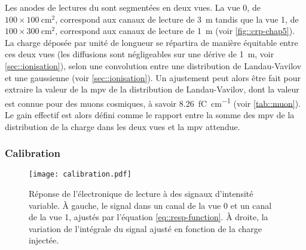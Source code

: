       Les anodes de lectures du \TOO sont segmentées en deux vues. La vue 0, de $100\times\SI{100}{\centi\meter\squared}$, correspond aux canaux de lecture de \SI{3}{\meter} tandis que la vue 1, de $100\times\SI{300}{\centi\meter\squared}$, correspond aux canaux de lecture de \SI{1}{\meter} (voir \autoref{fig::crp-chap5}). La charge déposée par unité de longueur se répartira de manière équitable entre ces deux vues (les diffusions sont négligeables sur une dérive de \SI{1}{\meter}, voir \autoref{sec::ionisation}), selon une convolution entre une distribution de Landau-Vavilov et une gaussienne (voir \autoref{sec::ionisation}). Un ajustement peut alors être fait pour extraire la valeur de la \gls{mpv} de la distribution de Landau-Vavilov, dont la valeur est connue pour des muons cosmiques, à savoir \SI{8.26}{\femto\coulomb\per\centi\meter} (voir \autoref{tab::muon}). Le gain effectif est alors défini comme le rapport entre la somme des \gls{mpv} de la distribution de la charge dans les deux vues et la \gls{mpv} attendue.

      \subsubsection{Calibration}

        \begin{figure}[htbp]
          \centering
          \texttt{[image: calibration.pdf]}
          \caption[Réponse de l'électronique de lecture]{\label{fig::cali-311}Réponse de l'électronique de lecture à des signaux d'intensité variable. À gauche, le signal dans un canal de la vue 0 et un canal de la vue 1, ajustés par l'équation \eqref{eq::resp-function}. À droite, la variation de l'intégrale du signal ajusté en fonction de la charge injectée.}
        \end{figure}

